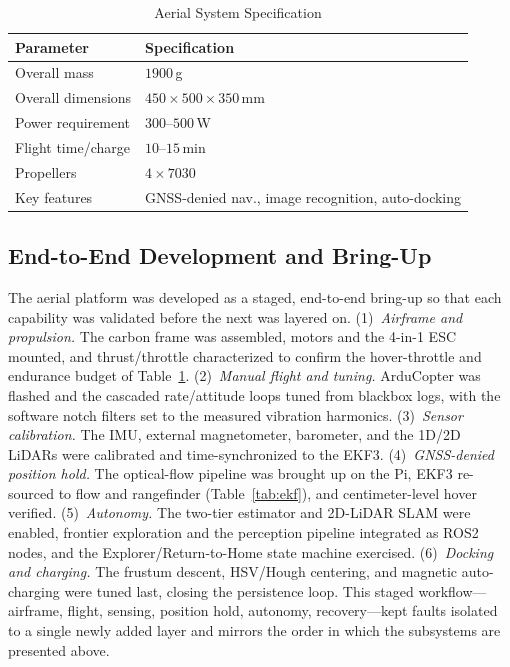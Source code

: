 \documentclass[journal]{IEEEtran}
\begin{document}
\begin{table}[!t]
\centering
\caption{Aerial System Specification}
\label{tab:spec}
\begin{tabular}{ll}
\toprule
Parameter & Specification\\
\midrule
Overall mass        & $1900$\,g\\
Overall dimensions  & $450\times500\times350$\,mm\\
Power requirement   & $300$--$500$\,W\\
Flight time/charge  & $10$--$15$\,min\\
Propellers          & $4\times7030$\\
Key features        & GNSS-denied nav., image recognition, auto-docking\\
\bottomrule
\end{tabular}
\end{table}

\subsection{End-to-End Development and Bring-Up}
The aerial platform was developed as a staged, end-to-end bring-up so that each
capability was validated before the next was layered on. (1)~\emph{Airframe and
propulsion.} The carbon frame was assembled, motors and the 4-in-1 ESC mounted,
and thrust/throttle characterized to confirm the hover-throttle and endurance
budget of Table~\ref{tab:spec}. (2)~\emph{Manual flight and tuning.} ArduCopter
was flashed and the cascaded rate/attitude loops tuned from blackbox logs, with
the software notch filters set to the measured vibration harmonics.
(3)~\emph{Sensor calibration.} The IMU, external magnetometer, barometer, and the
1D/2D LiDARs were calibrated and time-synchronized to the EKF3.
(4)~\emph{GNSS-denied position hold.} The optical-flow pipeline was brought up on
the Pi, EKF3 re-sourced to flow and rangefinder (Table~\ref{tab:ekf}), and
centimeter-level hover verified. (5)~\emph{Autonomy.} The two-tier estimator and
2D-LiDAR SLAM were enabled, frontier exploration and the perception pipeline
integrated as ROS2 nodes, and the Explorer/Return-to-Home state machine exercised.
(6)~\emph{Docking and charging.} The frustum descent, HSV/Hough centering, and
magnetic auto-charging were tuned last, closing the persistence loop. This staged
workflow---airframe, flight, sensing, position hold, autonomy, recovery---kept
faults isolated to a single newly added layer and mirrors the order in which the
subsystems are presented above.
\end{document}
